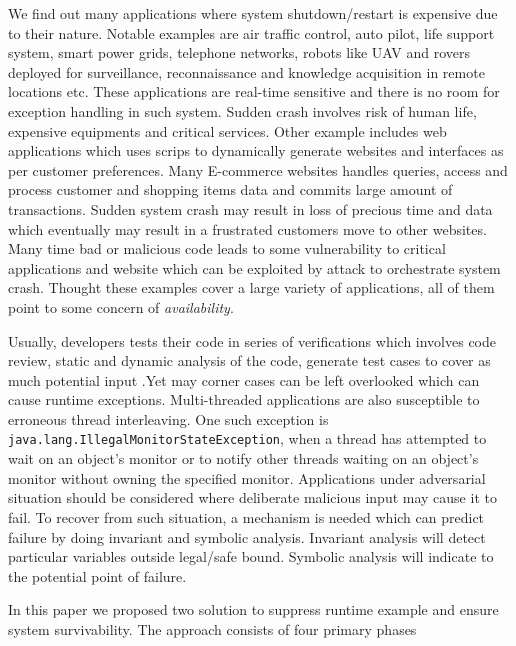 We find out many applications where system shutdown/restart is expensive due to
their nature.
Notable examples are air traffic control, auto pilot, life support system, smart
power grids, telephone networks, robots like UAV and rovers deployed for
surveillance, reconnaissance and knowledge acquisition in remote locations etc.
These applications are real-time sensitive and there is no room for exception
handling in such system.
Sudden crash involves risk of human life, expensive equipments and critical
services.
Other example includes web applications which uses scrips to dynamically
generate websites and interfaces as per customer preferences.
Many E-commerce websites handles queries, access and process customer and
shopping items data and commits large amount of transactions.
Sudden system crash may result in loss of precious time and data which
eventually may result in a frustrated customers move to other websites.
Many time bad or malicious code leads to some vulnerability to critical
applications and website which can be exploited by attack to orchestrate system
crash. Thought these examples cover a large variety of applications, all of them
point to some concern of \emph{availability}.

Usually, developers tests their code in series of verifications which involves
code review, static and dynamic analysis of the code, generate test cases to
cover as much potential input .Yet may corner cases can be left overlooked which
can cause runtime exceptions.
Multi-threaded applications are also susceptible to erroneous thread
interleaving. One such exception is
\texttt{java.lang.IllegalMonitorStateException}, when a thread has attempted to
wait on an object's monitor or to notify other threads waiting on an object's
monitor without owning the specified monitor. Applications under adversarial
situation should be considered where deliberate malicious input may cause it to
fail. To recover from such situation, a mechanism is needed which can predict
failure by doing invariant and symbolic analysis. Invariant analysis will detect
particular variables outside legal/safe bound. Symbolic analysis will indicate
to the potential point of failure.


In this paper we proposed two solution to suppress runtime example and ensure
system survivability. The approach consists of four primary phases

